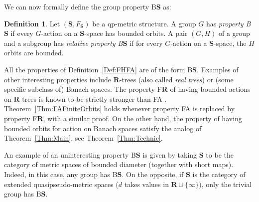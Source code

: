 \documentclass[a4paper]{article}
\theoremstyle{definition}
\newtheorem{defn}[lem]{Definition}
\newcommand*{\field}[1]{\mathbf{#1}}
\newcommand*{\R}{\field{R}}
\newcommand*{\BS}{B$\mathbf{S}$}
\begin{document}
We can now formally define the group property \BS{} as:
%
\begin{defn}\label{Def:PropBS}
Let $(\mathbf S,F_{\mathbf S})$ be a qp-metric structure.
A group $G$ has \emph{property \BS} if every $G$-action on a $\mathbf S$-space has bounded orbits.
A pair $(G,H)$ of a group and a subgroup has \emph{relative property \BS} if for every $G$-action on a $\mathbf S$-space, the $H$ orbits are bounded.
\end{defn}
%
%
All the properties of Definition~\ref{Def:FHFA} are of the form \BS.
Examples of other interesting properties include $\mathbf{R}$-trees (also called \emph{real trees}) or (some specific subclass of) Banach spaces.
The property F$\mathbf{R}$ of having bounded actions on $\mathbf{R}$-trees is known to be strictly stronger than FA \cite{MR3465847}. Theorem~\ref{Thm:FAFiniteOrbits} holds whenever property FA is replaced by property F$\mathbf{R}$, with a similar proof.
On the other hand, the property of having bounded orbits for action on Banach spaces satisfy the analog of Theorem~\ref{Thm:Main}, see Theorem~\ref{Thm:Technic}.

An example of an uninteresting property \BS{} is given by taking $\mathbf{S}$ to be the category of metric spaces of bounded diameter (together with short maps). Indeed, in this case, any group has \BS.
On the opposite, if $\mathbf{S}$ is the category of extended quasipseudo-metric spaces ($d$ takes values in $\R\cup\{\infty\})$, only the trivial group has \BS.
\end{document}
